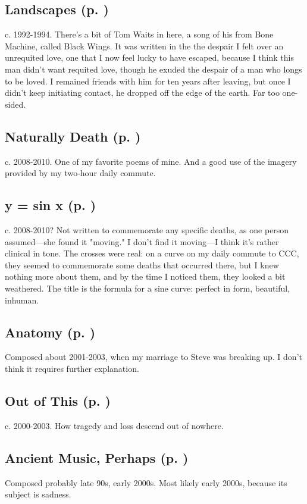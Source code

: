 \subsection*{Landscapes (p. \pageref{ch:landscapes})}
c. 1992-1994. There's a bit of Tom Waits in here, a song
of his from Bone Machine, called Black Wings. It was written in the the
despair I felt over an unrequited love, one that I now feel lucky to
have escaped, because I think this man didn't want requited love, though
he exuded the despair of a man who longs to be loved. I remained friends
with him for ten years after leaving, but once I didn't keep initiating
contact, he dropped off the edge of the earth. Far too one-sided.

\subsection*{Naturally Death (p. \pageref{ch:naturally_death})}
c. 2008-2010. One of my favorite poems of mine. And a
good use of the imagery provided by my two-hour daily
commute.

\subsection*{y = sin x (p. \pageref{ch:y_sin_x})}
c. 2008-2010? Not written to commemorate any specific
deaths, as one person assumed---she found it "moving." I don't find it
moving---I think it's rather clinical in tone. The crosses were real:
on a curve on my daily commute to CCC, they seemed to commemorate some
deaths that occurred there, but I knew nothing more about them, and by
the time I noticed them, they looked a bit weathered. The title is the
formula for a sine curve: perfect in form, beautiful, inhuman.

\subsection*{Anatomy (p. \pageref{ch:anatomy})}
Composed about
2001-2003, when my marriage to Steve was breaking up. I don't think it
requires further explanation.

\subsection*{Out of This (p. \pageref{ch:out_of_this})}
c. 2000-2003. How tragedy and loss descend out of
nowhere.

\subsection*{Ancient Music, Perhaps  (p. \pageref{ch:ancient_music})}
Composed probably late 90s,
early 2000s. Most likely early 2000s, because its subject is
sadness.

